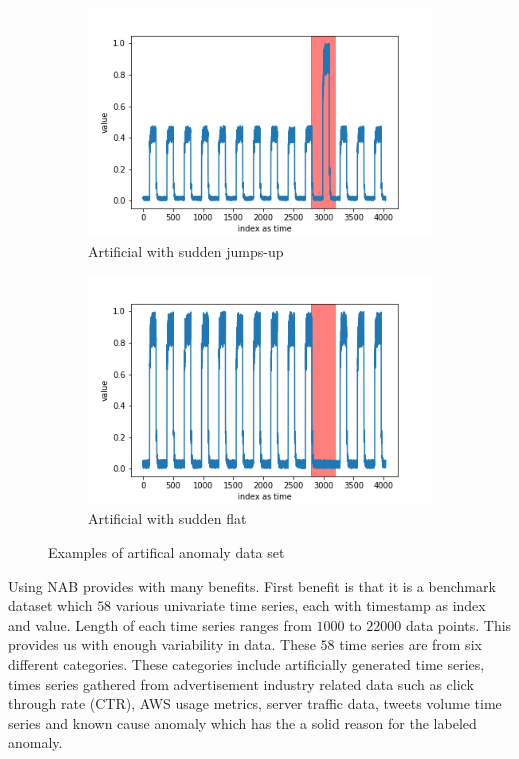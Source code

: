 \documentclass[12pt]{article}
\begin{document}
\begin{figure}[H]
  \medskip

  \begin{subfigure}[t]{0.5\textwidth}
    \centering
    \includegraphics[width=\linewidth]{images/dataAnomalies/artificial/art_daily_jumpsup.png}
    \caption{Artificial with sudden jumps-up}
  \end{subfigure}
  \hfill
  \begin{subfigure}[t]{0.5	\textwidth}
    \centering
    \includegraphics[width=\linewidth]{images/dataAnomalies/artificial/art_daily_nojump.png}
    \caption{Artificial with sudden flat}
  \end{subfigure}
  \caption{Examples of artifical anomaly data set}
  \label{artificialDataPlots}
\end{figure}
Using NAB provides with many benefits. First benefit is that it is a benchmark dataset which $58$ various univariate time series, each with timestamp as index and value. Length of each time series ranges from $1000$ to $22000$ data points. This provides us with enough variability in data. These $58$ time series are from six different categories. These categories include artificially generated time series, times series gathered from advertisement industry related data such as click through rate (CTR), AWS usage metrics, server traffic data, tweets volume time series and known cause anomaly which has the a solid reason for the labeled anomaly.\\
\end{document}
